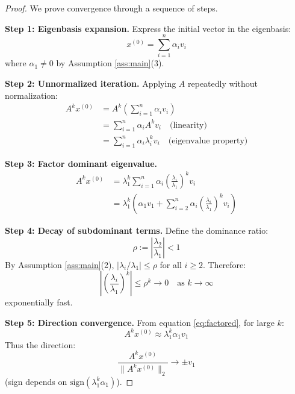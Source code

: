 \documentclass[11pt,twocolumn]{article}
\begin{document}
\begin{proof}
We prove convergence through a sequence of steps.

\textbf{Step 1: Eigenbasis expansion.}
Express the initial vector in the eigenbasis:
\begin{equation}
x^{(0)} = \sum_{i=1}^n \alpha_i v_i
\end{equation}
where $\alpha_1 \neq 0$ by Assumption \ref{ass:main}(3).

\textbf{Step 2: Unnormalized iteration.}
Applying $A$ repeatedly without normalization:
\begin{align}
A^k x^{(0)} &= A^k \left(\sum_{i=1}^n \alpha_i v_i\right) \nonumber \\
&= \sum_{i=1}^n \alpha_i A^k v_i \quad \text{(linearity)} \nonumber \\
&= \sum_{i=1}^n \alpha_i \lambda_i^k v_i \quad \text{(eigenvalue property)}
\end{align}

\textbf{Step 3: Factor dominant eigenvalue.}
\begin{align}
A^k x^{(0)} &= \lambda_1^k \sum_{i=1}^n \alpha_i \left(\frac{\lambda_i}{\lambda_1}\right)^k v_i \nonumber \\
&= \lambda_1^k \left(\alpha_1 v_1 + \sum_{i=2}^n \alpha_i \left(\frac{\lambda_i}{\lambda_1}\right)^k v_i\right) \label{eq:factored}
\end{align}

\textbf{Step 4: Decay of subdominant terms.}
Define the dominance ratio:
\begin{equation}
\rho := \left|\frac{\lambda_2}{\lambda_1}\right| < 1
\end{equation}
By Assumption \ref{ass:main}(2), $|\lambda_i/\lambda_1| \leq \rho$ for all $i \geq 2$. Therefore:
\begin{equation}
\left|\left(\frac{\lambda_i}{\lambda_1}\right)^k\right| \leq \rho^k \to 0 \quad \text{as } k \to \infty
\end{equation}
exponentially fast.

\textbf{Step 5: Direction convergence.}
From equation \eqref{eq:factored}, for large $k$:
\begin{equation}
A^k x^{(0)} \approx \lambda_1^k \alpha_1 v_1
\end{equation}
Thus the direction:
\begin{equation}
\frac{A^k x^{(0)}}{\|A^k x^{(0)}\|_2} \to \pm v_1
\end{equation}
(sign depends on $\text{sign}(\lambda_1^k \alpha_1)$).


\end{proof}
\end{document}
